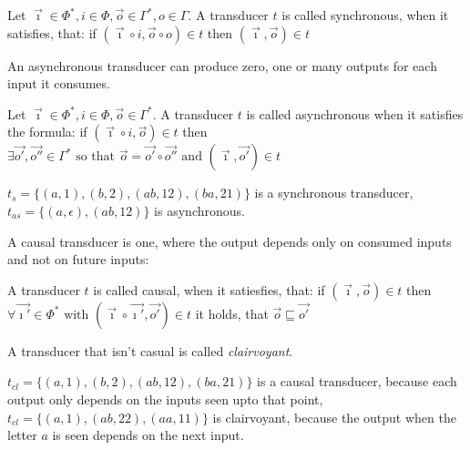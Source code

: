\begin{definition}[name = Synchronous Transducer]\label{def:synchronous_transducer}
Let \(\vec{\imath} \in \Phi^*, i \in \Phi, \vec{o} \in \Gamma^*, o \in \Gamma\).
  A transducer \(t\) is called synchronous, when it satisfies, that:
  if \( (\vec{\imath}\circ i,\vec{o}\circ o) \in t\)
  then \( (\vec{\imath}, \vec{o}) \in t \)
\end{definition}

An asynchronous transducer can produce zero, one or many outputs for each input it consumes.

\begin{definition}[name = Asynchronous Transducer]\label{def:asynchronous_transducer}
  Let \(\vec{\imath}\in \Phi^*, i \in \Phi,\vec{o} \in \Gamma^*\).
  A transducer \(t\) is called asynchronous when it satisfies the formula:
  if \((\vec{\imath}\circ i, \vec{o}) \in t \)
  then \(\exists \vec{o'},\vec{o''} \in \Gamma^*\text{ so that } \vec{o} = \vec{o'}\circ\vec{o''} \text{ and } (\vec{\imath},\vec{o'}) \in t \)
\end{definition}

\begin{exmp}[name = Synchronous and Asynchronous Transducers]
  \(t_s = \{(a,1),(b,2),(ab,12),(ba,21)\}\) is a synchronous transducer, \(t_{as} = \{(a,\epsilon),(ab,12)\}\) is asynchronous.
\end{exmp}

A causal transducer is one, where the output depends only on consumed inputs and not on future inputs:

\begin{definition}[name = Causal and Clairvoyant Transducers]\label{def:causal_transducer}
  A transducer \(t\) is called causal, when it satiesfies, that:
  if \((\vec{\imath},\vec{o}) \in t \)
  then \( \forall \vec{\imath'} \in \Phi^* \text{ with } (\vec{\imath} \circ \vec{\imath'}, \vec{o'}) \in t \)
  it holds, that \( \vec{o} \sqsubseteq \vec{o'} \)

  A transducer that isn't casual is called \emph{clairvoyant}.
\end{definition}


\begin{exmp}[name = Causal and Clairvoyant Transducers]
  \(t_{cl} = \{(a,1),(b,2),(ab,12),(ba,21)\}\) is a causal transducer, because each output only depends on the inputs seen upto that point, \(t_{cl} = \{(a,1),(ab,22),(aa,11)\}\) is clairvoyant, because the output when the letter \(a\) is seen depends on the next input.
\end{exmp}

